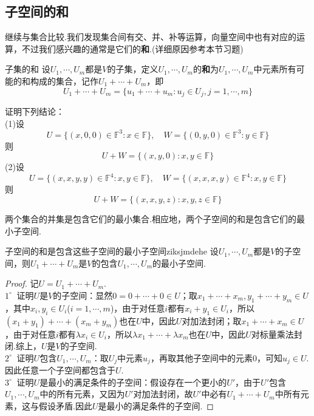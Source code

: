 \documentclass[lang=cn, zihao=5]{elegantbook}
\newcommand{\F}{\mathbb{F}}
\newcommand{\buzhou}[1]{$#1^{\circ} \ $}
\begin{document}
\subsection{子空间的和}

继续与集合比较.我们发现集合间有交、并、补等运算，向量空间中也有对应的运算，不过我们感兴趣的通常是它们的\textbf{和}.(详细原因参考本节习题)

\begin{definition}{子集的和}
    设$U_1,\cdots ,U_m$都是$V$的子集，定义$U_1, \cdots ,U_m$的\textbf{和}为$U_1, \cdots ,U_m$中元素所有可能的和构成的集合，记作$U_1+ \cdots +U_m$，即$$U_1+ \cdots +U_m = \{ u_1+ \cdots +u_m : u_j \in U_j,j=1, \cdots ,m \}$$
\end{definition}

\begin{example}
    证明下列结论： \\
    (1)设$$U = \{ (x,0,0) \in \F ^{3} : x \in \F \} , \quad W = \{ (0,y,0) \in \F ^{3} : y \in \F \}$$
    则$$U+W = \{ (x,y,0) : x,y \in \F \}$$
    (2)设$$U = \{ (x,x,y,y) \in \F ^{4} : x,y \in \F \} , \quad W = \{ (x,x,x,y) \in \F ^{4} : x,y \in \F \}$$
    则$$U+W = \{ (x,x,y,z) : x,y,z \in \F \}$$
\end{example}

两个集合的并集是包含它们的最小集合.相应地，两个子空间的和是包含它们的最小子空间.

\begin{proposition}{子空间的和是包含这些子空间的最小子空间}{ziksjmdehe}
    设$U_1,\cdots ,U_m$都是$V$的子空间，则$U_1+\cdots +U_m$是$V$的包含$U_1,\cdots ,U_m$的最小子空间.
\end{proposition}
\begin{proof}
    记$U=U_1+\cdots +U_m$. \\
    \buzhou{1} 证明$U$是$V$的子空间：显然$0=0 + \cdots + 0 \in U$；取$x_1+ \cdots +x_m,y_1+ \cdots +y_m \in U$，其中$x_i,y_i \in U_i$($i=1,\cdots ,m$)，由于对任意$i$都有$x_i+y_1 \in U_i$，所以$(x_1+y_1) + \cdots + (x_m+y_m)$也在$U$中，因此$U$对加法封闭；取$x_1+ \cdots +x_m \in U$，由于对任意$i$都有$\lambda x_i \in U_i$，所以$\lambda x_1 + \cdots + \lambda x_m$也在$U$中，因此$U$对标量乘法封闭.综上，$U$是$V$的子空间.\\
    \buzhou{2} 证明$U$包含$U_1,\cdots ,U_m$：取$U_j$中元素$u_j$，再取其他子空间中的元素$0$，可知$u_j \in U$.因此任意一个子空间都包含于$U$. \\
    \buzhou{3} 证明$U$是最小的满足条件的子空间：假设存在一个更小的$U'$，由于$U'$包含$U_1, \cdots ,U_m$中的所有元素，又因为$U'$对加法封闭，故$U'$中必有$U_1+ \cdots +U_m$中所有元素，这与假设矛盾.因此$U$是最小的满足条件的子空间.
\end{proof}
\end{document}
